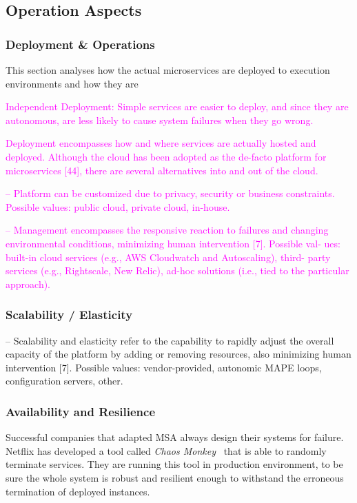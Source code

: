 \documentclass[thesis=M,english,hidelinks]{FITthesis}[2012/10/20]
\begin{document}
\subsection{Operation Aspects}
\subsubsection{Deployment \& Operations}
\label{sec:operations}
This section analyses how the actual microservices are deployed to execution environments and how they are 


\textcolor{magenta}{Independent Deployment: Simple services are easier to deploy, and since they are autonomous, are less likely to cause system failures when they go wrong.}

\textcolor{magenta}{Deployment encompasses how and where services are actually hosted and deployed. Although the cloud has been adopted as the de-facto platform for microservices [44], there are several alternatives into and out of the cloud.}

\textcolor{magenta}{– Platform can be customized due to privacy, security or business constraints. Possible values: public cloud, private cloud, in-house.}

\textcolor{magenta}{– Management encompasses the responsive reaction to failures and changing environmental conditions, minimizing human intervention [7]. Possible val- ues: built-in cloud services (e.g., AWS Cloudwatch and Autoscaling), third- party services (e.g., Rightscale, New Relic), ad-hoc solutions (i.e., tied to the particular approach).}


\subsubsection{Scalability / Elasticity}
\label{sec:scalability}
– Scalability and elasticity refer to the capability to rapidly adjust the overall capacity of the platform by adding or removing resources, also minimizing human intervention [7]. Possible values: vendor-provided, autonomic MAPE loops, configuration servers, other.



\subsubsection{Availability and Resilience}
\label{sec:resilience}
Successful companies that adapted \acrshort{MSA} always design their systems for failure. 
Netflix has developed a tool called \textit{Chaos Monkey}~\cite{chaos-monkey} that is able to randomly terminate services. They are running this tool in production environment, to be sure the whole system is robust and resilient enough to withstand the erroneous termination of deployed instances.
\end{document}
